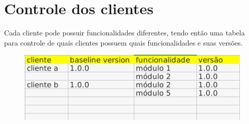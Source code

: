 \documentclass{article}
\begin{document}
    \section{Controle dos clientes}
    Cada cliente pode possuir funcionalidades diferentes, tendo então uma tabela para controle de quais clientes possuem quais funcionalidades e suas versões.
        \begin{figure}[H]
			\centering
			\includegraphics[width=0.7\linewidth]{controle_cliente_software.png}
			\caption{}
			\label{fig:controleclientesoftware}
		\end{figure}
        
    \newpage
	\begin{appendix}
		\listoffigures
		\listoftables
	\end{appendix}
\end{document}
